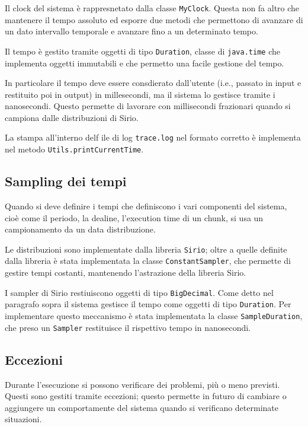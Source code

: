 Il clock del sistema è rappresnetato dalla classe \texttt{MyClock}. Questa non fa altro che mantenere il tempo assoluto ed esporre due metodi che permettono di avanzare di un dato intervallo temporale e avanzare fino a un determinato tempo.

\myskip

Il tempo è gestito tramite oggetti di tipo \texttt{Duration}, classe di \texttt{java.time} che implementa oggetti immutabili e che permetto una facile gestione del tempo.

In particolare il tempo deve essere consdierato dall'utente (i.e., passato in input e restituito poi in output) in millesecondi, ma il sistema lo gestisce tramite i nanosecondi. Questo permette di lavorare con millisecondi frazionari quando si campiona dalle distribuzioni di Sirio.

La stampa all'interno delf ile di log \texttt{trace.log} nel formato corretto è implementa nel metodo \texttt{Utils.printCurrentTime}.

\subsection{Sampling dei tempi}
Quando si deve definire i tempi che definiscono i vari componenti del sistema, cioè come il periodo, la dealine, l'execution time di un chunk, si usa un campionamento da un data distribuzione.

Le distribuzioni sono implementate dalla libreria \texttt{Sirio}; oltre a quelle definite dalla libreria è stata implementata la classe \texttt{ConstantSampler}, che permette di gestire tempi costanti, mantenendo l'astrazione della libreria Sirio.

\myskip

I sampler di Sirio restiuiscono oggetti di tipo \texttt{BigDecimal}. Come detto nel paragrafo sopra il sistema gestisce il tempo come oggetti di tipo \texttt{Duration}. Per implementare questo meccanismo è stata implementata la classe \texttt{SampleDuration}, che preso un \texttt{Sampler} restituisce il rispettivo tempo in nanosecondi.

\subsection{Eccezioni}
Durante l'esecuzione si possono verificare dei problemi, più o meno previsti. Questi sono gestiti tramite eccezioni; questo permette in futuro di cambiare o aggiungere un comportamente del sistema quando si verificano determinate situazioni.

